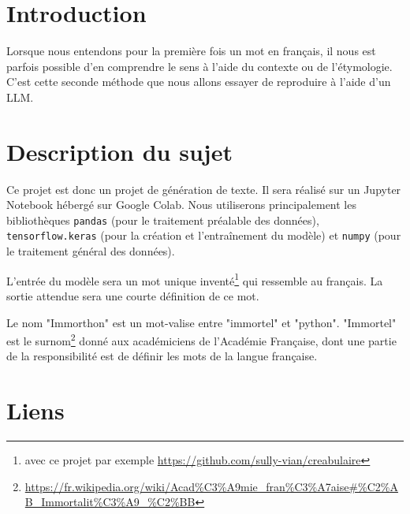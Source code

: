 \documentclass[french]{template}
\begin{document}

\fairemarges
\fairepagedegarde
\tabledematieres

\section{Introduction}

Lorsque nous entendons pour la première fois un mot en français, il nous est parfois possible d'en comprendre le sens à l'aide du contexte ou de l'étymologie. C'est cette seconde méthode que nous allons essayer de reproduire à l'aide d'un LLM.

\section{Description du sujet}

Ce projet est donc un projet de génération de texte. Il sera réalisé sur un Jupyter Notebook hébergé sur Google Colab. Nous utiliserons principalement les bibliothèques \texttt{pandas} (pour le traitement préalable des données), \texttt{tensorflow.keras} (pour la création et l'entraînement du modèle) et \texttt{numpy} (pour le traitement général des données).

\vspace{\baselineskip}
L'entrée du modèle sera un mot unique inventé\footnote{avec ce projet par exemple \url{https://github.com/sully-vian/creabulaire}} qui ressemble au français. La sortie attendue sera une courte définition de ce mot.

\vspace{\baselineskip}
Le nom "Immorthon" est un mot-valise entre "immortel" et "python". "Immortel" est le surnom\footnote{\url{https://fr.wikipedia.org/wiki/Acad\%C3\%A9mie_fran\%C3\%A7aise\#\%C2\%AB_Immortalit\%C3\%A9_\%C2\%BB}} donné aux académiciens de l'Académie Française, dont une partie de la responsibilité est de définir les mots de la langue française.

\section{Liens}
\end{document}
